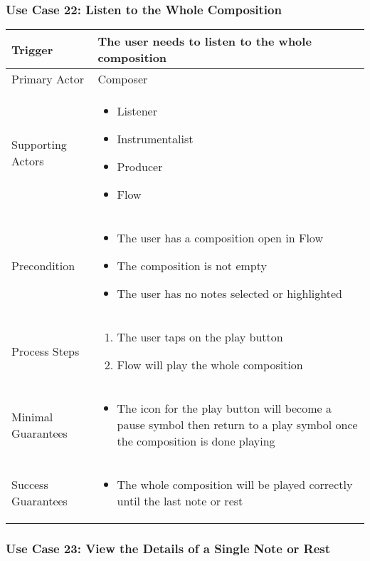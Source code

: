 \subsubsection{Use Case 22: Listen to the Whole Composition}

\begin{tabularx}{\textwidth}{|X|X|}
\hline
Trigger & 
The user needs to listen to the whole composition \\
\hline
Primary Actor & 
Composer \\
\hline
Supporting Actors & 
\begin{itemize}
\item Listener
\item Instrumentalist
\item Producer
\item Flow
\end{itemize} \\
\hline
Precondition & 
\begin{itemize}
\item The user has a composition open in Flow
\item The composition is not empty
\item The user has no notes selected or highlighted
\end{itemize} \\
\hline
Process Steps & 
\begin{enumerate}
\item The user taps on the play button
\item Flow will play the whole composition
\end{enumerate} \\
\hline
Minimal Guarantees & 
\begin{itemize}
  \item The icon for the play button will become a pause symbol then return to a play symbol once the composition is done playing
\end{itemize} \\
\hline
Success Guarantees & 
\begin{itemize}
  \item The whole composition will be played correctly until the last note or rest
\end{itemize} \\
\hline
\end{tabularx}

\subsubsection{Use Case 23: View the Details of a Single Note or Rest}

